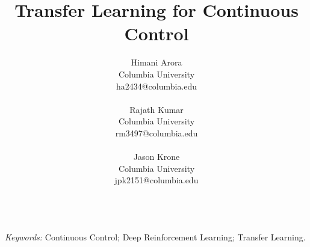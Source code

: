 \documentclass[12pt]{article}
\title{%
\textbf{Transfer Learning for Continuous Control}
}
\author{
Himani Arora \\
Columbia University \\
ha2434@columbia.edu \\
\\
Rajath Kumar\\
Columbia University\\
rm3497@columbia.edu\\
\\
Jason Krone\\
Columbia University \\
jpk2151@columbia.edu \\
\\
}
\begin{document}
\maketitle
\bigskip



\emph{Keywords:}
Continuous Control;
Deep Reinforcement Learning;
Transfer Learning.

\clearpage
\glsresetall{}

%

\clearpage












\clearpage

%




\clearpage
\appendix

%
\end{document}
